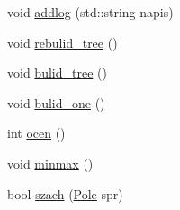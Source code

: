 \begin{DoxyCompactItemize}
\item 
void \hyperlink{class_rozgrywka_a08d9672c38d5f79af2c36492dce6690f}{addlog} (std\-::string napis)
\item 
void \hyperlink{class_rozgrywka_a7958d4c1c224107c0653f7748a479878}{rebulid\-\_\-tree} ()
\item 
void \hyperlink{class_rozgrywka_a24317fb3c62860672c260b68d9726cec}{bulid\-\_\-tree} ()
\item 
void \hyperlink{class_rozgrywka_a9ce747229d6682ddda26e68046174ed5}{bulid\-\_\-one} ()
\item 
int \hyperlink{class_rozgrywka_a2d9e12afa1eefa14db00415fd5e51f0e}{ocen} ()
\item 
void \hyperlink{class_rozgrywka_a6ea4f58b867e965675a4a7636e7f3214}{minmax} ()
\item 
bool \hyperlink{class_rozgrywka_ac3b8130edcb63f1f828e6e613a2cc05c}{szach} (\hyperlink{class_pole}{\-Pole} spr)
\end{DoxyCompactItemize}
